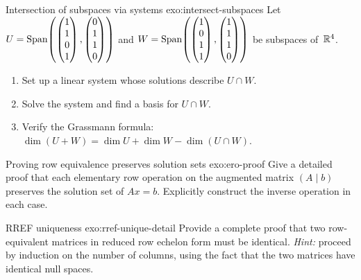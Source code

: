 \begin{exercise}{Intersection of subspaces via systems
\challenging}{exo:intersect-subspaces}
Let $U = \operatorname{Span}\!\left(\begin{pmatrix}1\\1\\0\\1\end{pmatrix},
\begin{pmatrix}0\\1\\1\\0\end{pmatrix}\right)$ and
$W = \operatorname{Span}\!\left(\begin{pmatrix}1\\0\\1\\1\end{pmatrix},
\begin{pmatrix}1\\1\\1\\0\end{pmatrix}\right)$ be subspaces
of~${\mathbb{R}}^4$.
\begin{enumerate}[label=(\alph*)]
  \item Set up a linear system whose solutions describe $U\cap W$.
  \item Solve the system and find a basis for $U\cap W$.
  \item Verify the Grassmann formula:
    $\dim(U+W) = \dim U + \dim W - \dim(U\cap W)$.
\end{enumerate}
\end{exercise}

\begin{exercise}{Proving row equivalence preserves solution sets
\intermediate}{exo:ero-proof}
Give a detailed proof that each elementary row operation on the
augmented matrix $(A\mid b)$ preserves the solution set of $Ax = b$.
Explicitly construct the inverse operation in each case.
\end{exercise}

\begin{exercise}{RREF uniqueness \challenging}{exo:rref-unique-detail}
Provide a complete proof that two row-equivalent matrices in reduced
row echelon form must be identical.
\textit{Hint:} proceed by induction on the number of columns, using
the fact that the two matrices have identical null spaces.
\end{exercise}


